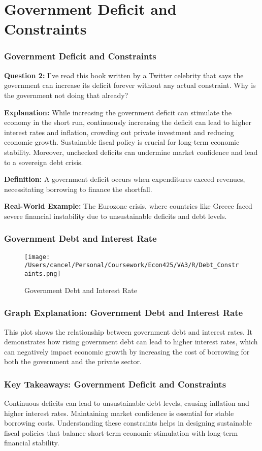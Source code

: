 \documentclass{beamer}
\begin{document}
\section{Government Deficit and Constraints}
\begin{frame}
    \frametitle{Government Deficit and Constraints}
    \textbf{Question 2:} I’ve read this book written by a Twitter celebrity that says the government can increase its deficit forever without any actual constraint. Why is the government not doing that already?

    \textbf{Explanation:} While increasing the government deficit can stimulate the economy in the short run, continuously increasing the deficit can lead to higher interest rates and inflation, crowding out private investment and reducing economic growth. Sustainable fiscal policy is crucial for long-term economic stability. Moreover, unchecked deficits can undermine market confidence and lead to a sovereign debt crisis.

    \textbf{Definition:} A government deficit occurs when expenditures exceed revenues, necessitating borrowing to finance the shortfall.

    \textbf{Real-World Example:} The Eurozone crisis, where countries like Greece faced severe financial instability due to unsustainable deficits and debt levels.
\end{frame}

\begin{frame}
    \frametitle{Government Debt and Interest Rate}
    \begin{figure}[h!]
        \centering
        \texttt{[image: /Users/cancel/Personal/Coursework/Econ425/VA3/R/Debt\_Constraints.png]}
        \caption{Government Debt and Interest Rate}
    \end{figure}
\end{frame}

\begin{frame}
    \frametitle{Graph Explanation: Government Debt and Interest Rate}
    This plot shows the relationship between government debt and interest rates. It demonstrates how rising government debt can lead to higher interest rates, which can negatively impact economic growth by increasing the cost of borrowing for both the government and the private sector.
\end{frame}

\begin{frame}
    \frametitle{Key Takeaways: Government Deficit and Constraints}
    Continuous deficits can lead to unsustainable debt levels, causing inflation and higher interest rates. Maintaining market confidence is essential for stable borrowing costs. Understanding these constraints helps in designing sustainable fiscal policies that balance short-term economic stimulation with long-term financial stability.
\end{frame}
\end{document}
